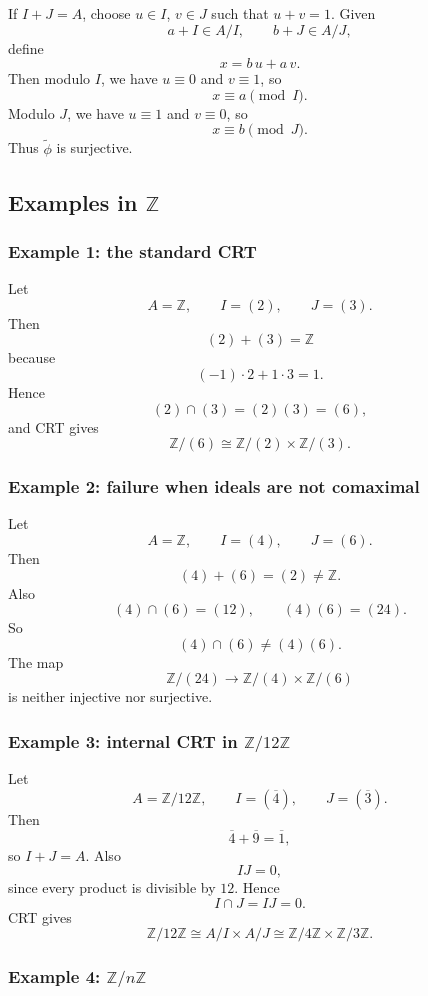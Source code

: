 \documentclass[12pt,a4paper]{article}
\theoremstyle{notespace}
\begin{document}
If \(I+J=A\), choose \(u\in I\), \(v\in J\) such that \(u+v=1\). Given
\[
a+I\in A/I,\qquad b+J\in A/J,
\]
define
\[
x=b\,u+a\,v.
\]
Then modulo \(I\), we have \(u\equiv 0\) and \(v\equiv 1\), so
\[
x\equiv a \pmod I.
\]
Modulo \(J\), we have \(u\equiv 1\) and \(v\equiv 0\), so
\[
x\equiv b \pmod J.
\]
Thus \(\widetilde\phi\) is surjective.

\subsection{Examples in \(\mathbb Z\)}

\subsubsection*{Example 1: the standard CRT}

Let
\[
A=\mathbb Z,\qquad I=(2),\qquad J=(3).
\]
Then
\[
(2)+(3)=\mathbb Z
\]
because
\[
(-1)\cdot 2+1\cdot 3=1.
\]
Hence
\[
(2)\cap(3)=(2)(3)=(6),
\]
and CRT gives
\[
\mathbb Z/(6)\cong \mathbb Z/(2)\times \mathbb Z/(3).
\]

\subsubsection*{Example 2: failure when ideals are not comaximal}

Let
\[
A=\mathbb Z,\qquad I=(4),\qquad J=(6).
\]
Then
\[
(4)+(6)=(2)\neq \mathbb Z.
\]
Also
\[
(4)\cap(6)=(12),\qquad (4)(6)=(24).
\]
So
\[
(4)\cap(6)\neq (4)(6).
\]
The map
\[
\mathbb Z/(24)\to \mathbb Z/(4)\times \mathbb Z/(6)
\]
is neither injective nor surjective.

\subsubsection*{Example 3: internal CRT in \(\mathbb Z/12\mathbb Z\)}

Let
\[
A=\mathbb Z/12\mathbb Z,
\qquad
I=(\overline 4),
\qquad
J=(\overline 3).
\]
Then
\[
\overline 4+\overline 9=\overline 1,
\]
so \(I+J=A\). Also
\[
IJ=0,
\]
since every product is divisible by \(12\). Hence
\[
I\cap J=IJ=0.
\]
CRT gives
\[
\mathbb Z/12\mathbb Z\cong A/I\times A/J \cong \mathbb Z/4\mathbb Z\times \mathbb Z/3\mathbb Z.
\]

\subsubsection*{Example 4: \(\mathbb Z/n\mathbb Z\)}
\end{document}
